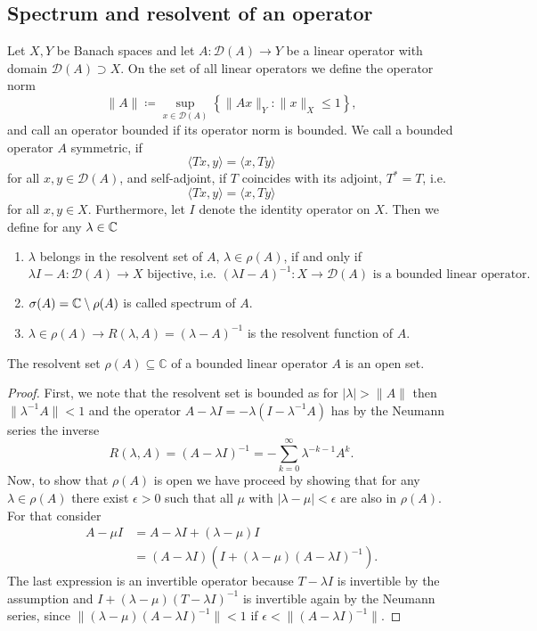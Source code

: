 \subsection*{Spectrum and resolvent of an operator}
Let $X, Y$ be Banach spaces and let $A \colon \mathcal{D}(A) \rightarrow Y$ be a linear operator with domain $\mathcal{D}(A) \supset X$. On the set of all linear operators we define the operator norm 
	\[ \| A \| \coloneqq \sup_{x \in \mathcal{D}(A)} \left\{ \| A x \|_{Y} \colon \| x \|_{X} \leq 1 \right\}, \]
and call an operator bounded if its operator norm is bounded. We call a bounded operator $A$ symmetric, if %
	\[  \langle Tx,y \rangle = \langle x ,Ty \rangle \]
for all $x,y \in \mathcal{D}(A)$, and self-adjoint, if $T$ coincides with its adjoint, $T^{*} = T$, i.e. 
	\[ \langle Tx,y \rangle = \langle x ,Ty \rangle \]
for all $x,y \in X$. Furthermore, let $I$ denote the identity operator on $X$. Then we define for any $\lambda \in \mathbb{C}$
	\begin{enumerate}[label=\alph*\upshape)]
		\item $\lambda$ belongs in the resolvent set of $A$, $\lambda \in \rho(A)$, if and only if
			\[ \lambda I - A \colon \mathcal{D}(A) \rightarrow X \text{ bijective, i.e. } (\lambda I - A)^{-1} \colon X \rightarrow \mathcal{D}(A) \text{ is a bounded linear operator.} \]
		\item $\sigma(A) = \mathbb{C} \setminus \rho(A)$ is called spectrum of $A$.
		\item $\lambda \in \rho(A) \rightarrow R(\lambda, A) = (\lambda - A)^{-1}$ is the resolvent function of $A$.
	\end{enumerate}		

\begin{theorem}
	The resolvent set $\rho(A) \subseteq \mathbb{C}$ of a bounded linear operator $A$ is an open set.
	
	\begin{proof}
		First, we note that the resolvent set is bounded as for $|\lambda| > \|A\|$ then $\| \lambda^{-1} A \| < 1$ and the operator $A - \lambda I = -\lambda (I - \lambda^{-1} A)$ has by the Neumann series the inverse
		$$ R(\lambda, A) = (A - \lambda I)^{-1} = - \sum_{k=0}^{\infty} \lambda^{-k-1} A^{k}. $$
		Now, to show that $\rho(A)$ is open we have proceed by showing that for any $\lambda \in \rho(A)$ there exist $\epsilon > 0$ such that all $\mu$ with $|\lambda- \mu| < \epsilon$ are also in $\rho(A)$. For that consider
		\begin{align*}
			A - \mu I & = A - \lambda I + (\lambda - \mu) I \\
					  & = (A - \lambda I)\left(I + (\lambda - \mu) (A - \lambda I)^{-1} \right).
		\end{align*}
		The last expression is an invertible operator because $T - \lambda I$ is invertible by the assumption and $I + (\lambda - \mu)(T - \lambda I)^{-1}$ is invertible again by the Neumann series, since $\|(\lambda - \mu)(A - \lambda I)^{-1}\| < 1$ if $\epsilon < \|(A - \lambda I)^{-1}\|$.
	\end{proof}
\end{theorem}

